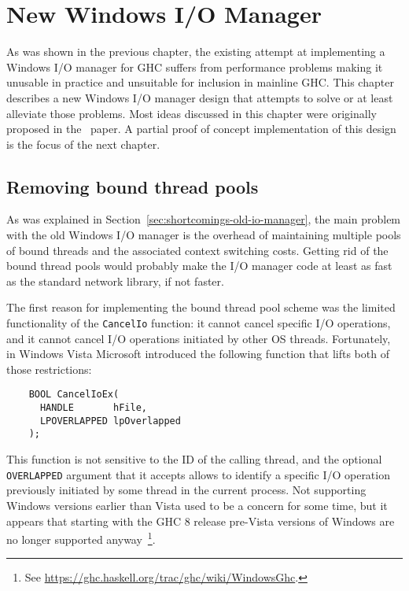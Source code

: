 \documentclass[a4paper,11pt,oneside]{report}
\begin{document}
\chapter{New Windows I/O Manager}
\label{chap:new-io-manager}

As was shown in the previous chapter, the existing attempt at implementing a
Windows I/O manager for GHC suffers from performance problems making it unusable
in practice and unsuitable for inclusion in mainline GHC. This chapter describes
a new Windows I/O manager design that attempts to solve or at least alleviate
those problems. Most ideas discussed in this chapter were originally proposed in
the~\cite{bib:voellmy} paper. A partial proof of concept implementation of this
design is the focus of the next chapter.

\section{Removing bound thread pools}

As was explained in Section~\ref{sec:shortcomings-old-io-manager}, the main
problem with the old Windows I/O manager is the overhead of maintaining multiple
pools of bound threads and the associated context switching costs. Getting rid
of the bound thread pools would probably make the I/O manager code at least as
fast as the standard network library, if not faster.

The first reason for implementing the bound thread pool scheme was the limited
functionality of the \texttt{CancelIo} function: it cannot cancel specific I/O
operations, and it cannot cancel I/O operations initiated by other OS
threads. Fortunately, in Windows Vista Microsoft introduced the following
function that lifts both of those restrictions:

\begin{verbatim}
    BOOL CancelIoEx(
      HANDLE       hFile,
      LPOVERLAPPED lpOverlapped
    );
\end{verbatim}

This function is not sensitive to the ID of the calling thread, and the optional
\texttt{OVERLAPPED} argument that it accepts allows to identify a specific I/O
operation previously initiated by some thread in the current process. Not
supporting Windows versions earlier than Vista used to be a concern for some
time, but it appears that starting with the GHC 8 release pre-Vista versions of
Windows are no longer supported anyway~\footnote{See
  \url{https://ghc.haskell.org/trac/ghc/wiki/WindowsGhc}.}.
\end{document}
